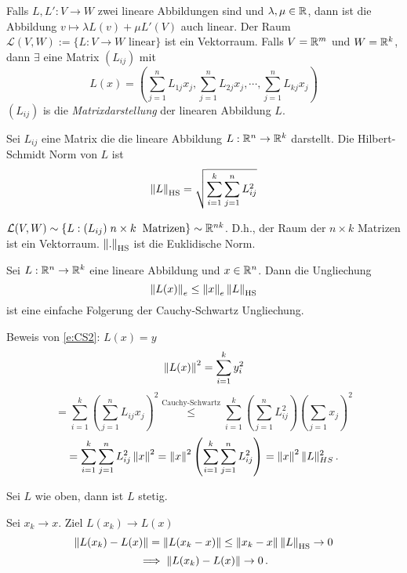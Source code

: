 Falls $L, L':V\to W$ zwei lineare Abbildungen sind und $\lambda,\mu\in \mathbb{R}$, dann ist die Abbildung
$v\mapsto \lambda L(v) + \mu L' (V)$ auch linear. Der Raum $\mathcal{L} (V, W) :=
\{L:V\to W \mbox{ linear}\}$ ist
ein Vektorraum.
Falls $V= \mathbb{R}^m$ und $W= \mathbb{R}^k$, dann $\exists$ eine Matrix $(L_{ij})$ mit
  \[L(x)=\left( \sum^n_{j=1}L_{1j}x_j,\sum^n_{j=1}L_{2j}x_j,\cdots,\sum^n_{j=1}L_{kj}x_j \right)\]
$(L_{ij})$ is die {\em Matrixdarstellung} der linearen Abbildung $L$.

\begin{Def}
  Sei $L_{ij}$ eine Matrix die die lineare Abbildung $L:\mathbb{R}^n\rightarrow\mathbb{R}^k$ darstellt. Die Hilbert-Schmidt Norm von $L$ ist
  \[\left\| L \right\|_{\text{HS}}=\sqrt{\sum^k_{i=1}\sum^n_{j=1}L_{ij}^2}\]
\end{Def}
\begin{Bem}
 $\mathcal{L} (V,W) \sim \left\{ L:(L_{ij})\; n\times k\hspace{2mm}\text{Matrizen} \right\}\sim \mathbb{R}^{nk}$. D.h., der Raum der $n\times k$ Matrizen
ist ein Vektorraum. $\left\| . \right\|_{\text{HS}}$ ist die Euklidische Norm.
\end{Bem}
\begin{Bem}
  Sei $L:\mathbb{R}^n\rightarrow\mathbb{R}^k$ eine lineare Abbildung und $x\in\mathbb{R}^n$. Dann die
Ungliechung 
\begin{equation}\label{e:CS2}
\left\| L(x) \right\|_e\leq\left\| x \right\|_e\left\| L \right\|_\text{HS}
\end{equation} 
ist eine einfache Folgerung der
Cauchy-Schwartz Ungliechung.
\end{Bem}
\begin{Bew}
  Beweis von \eqref{e:CS2}: $L(x)=y$
  \[
\left\| L(x) \right\|^2=\sum^k_{i=1}y_i^2\]
  \[=\sum^k_{i=1}\left( \sum^n_{j=1}L_{ij}x_j \right)^2\stackrel{\text{Cauchy-Schwartz}}{\leq}\sum^k_{i=1}\left( \sum^n_{j=1}L_{ij}^2 \right)\left( \sum_{j=1}x_j \right)^2\]
  \[=\sum^k_{i=1}\sum^n_{j=1}L_{ij}^2\left\| x \right\|^2=\left\| x \right\|^2\left( \sum^k_{i=1}\sum^n_{j=1}L_{ij}^2\right) = \left\| x \right\|^2\|L\|^2_{HS}\, .
\]
\end{Bew}

\begin{Kor}
  Sei $L$ wie oben, dann ist $L$ stetig.
\end{Kor}
\begin{Bew}
  Sei $x_k\to x$. Ziel $L(x_k)\to L(x)$
  \[\left\| L(x_k)-L(x) \right\|=\left\| L(x_k-x) \right\|\leq\left\| x_k-x \right\|\left\| L \right\|_\text{HS}\rightarrow 0\]
  \[\implies \left\| L(x_k)-L(x) \right\|\rightarrow 0\, .\]
\end{Bew}

